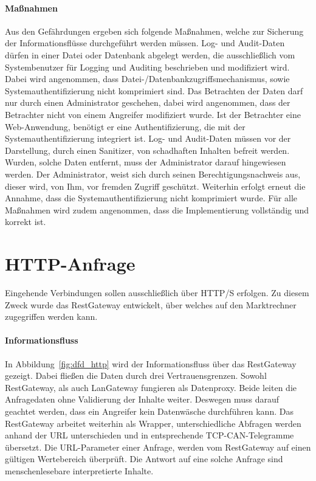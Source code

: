 \documentclass[11pt,a4paper]{report}
\begin{document}
\paragraph{Maßnahmen}

Aus den Gefährdungen ergeben sich folgende Maßnahmen, welche zur Sicherung der Informationsflüsse durchgeführt werden müssen. Log- und Audit-Daten dürfen in einer Datei oder Datenbank abgelegt werden, die ausschließlich vom Systembenutzer für Logging und Auditing beschrieben und modifiziert wird. Dabei wird angenommen, dass Datei-/Datenbankzugriffsmechanismus, sowie Systemauthentifizierung nicht komprimiert sind. Das Betrachten der Daten darf nur durch einen Administrator geschehen, dabei wird angenommen, dass der Betrachter nicht von einem Angreifer modifiziert wurde. Ist der Betrachter eine Web-Anwendung, benötigt er eine Authentifizierung, die mit der Systemauthentifizierung integriert ist. Log- und Audit-Daten müssen vor der Darstellung, durch einen Sanitizer, von schadhaften Inhalten befreit werden. Wurden, solche Daten entfernt, muss der Administrator darauf hingewiesen werden. Der Administrator, weist sich durch seinen Berechtigungsnachweis aus, dieser wird, von Ihm, vor fremden Zugriff geschützt. Weiterhin erfolgt erneut die Annahme, dass die Systemauthentifizierung nicht komprimiert wurde. Für alle Maßnahmen wird zudem angenommen, dass die Implementierung vollständig und korrekt ist.

\section{HTTP-Anfrage} \label{sec:model_http}

Eingehende Verbindungen sollen ausschließlich über HTTP/S erfolgen. Zu diesem Zweck wurde das RestGateway entwickelt, über welches auf den Marktrechner zugegriffen werden kann. 

\paragraph{Informationsfluss}

In Abbildung~\ref{fig:dfd_http} wird der Informationsfluss über das RestGateway gezeigt. Dabei fließen die Daten durch drei Vertrauensgrenzen. Sowohl RestGateway, als auch LanGateway fungieren als Datenproxy. Beide leiten die Anfragedaten ohne Validierung der Inhalte weiter. Deswegen muss darauf geachtet werden, dass ein Angreifer kein Datenwäsche durchführen kann. Das RestGateway arbeitet weiterhin als Wrapper, unterschiedliche Abfragen werden anhand der URL unterschieden und in entsprechende TCP-CAN-Telegramme übersetzt. Die URL-Parameter einer Anfrage, werden vom RestGateway auf einen gültigen Wertebereich überprüft. Die Antwort auf eine solche Anfrage sind menschenlesebare interpretierte Inhalte.
\end{document}
